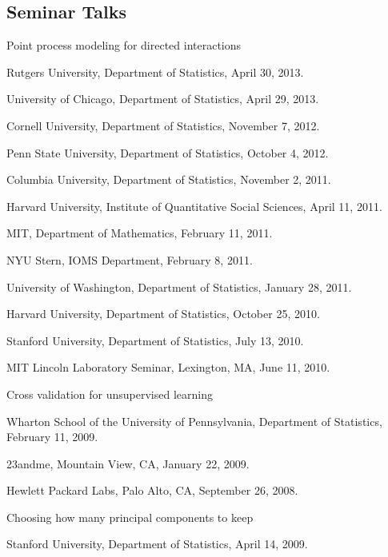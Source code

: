 \documentclass[10pt,letterpaper]{article}
\renewenvironment{itemize}{
  \begin{list}{}{
    \setlength{\leftmargin}{1.5em}
    \setlength{\itemsep}{0.25em}
    \setlength{\parskip}{0pt}
    \setlength{\parsep}{0.25em}
  }
}{
  \end{list}
}
\begin{document}
\subsection*{Seminar Talks}

\begin{itemize}

\item Point process modeling for directed interactions
  \begin{itemize}
  \item Rutgers University, Department of Statistics, April 30, 2013.
  \item University of Chicago, Department of Statistics, April 29, 2013.
  \item Cornell University, Department of Statistics, November 7, 2012.
  \item Penn State University, Department of Statistics, October 4, 2012.
  \item Columbia University, Department of Statistics, November 2, 2011.
  \item Harvard University, Institute of Quantitative Social Sciences, April 11, 2011.
  \item MIT, Department of Mathematics, February 11, 2011.
  \item NYU Stern, IOMS Department, February 8, 2011.
  \item University of Washington, Department of Statistics, January 28, 2011.
  \item %
    Harvard University, Department of Statistics, October 25, 2010.
  \item %
    Stanford University, Department of Statistics, July 13, 2010.
  \item %
    MIT Lincoln Laboratory Seminar, Lexington, MA, June 11, 2010.
  \end{itemize}


\item Cross validation for unsupervised learning
  \begin{itemize}
    \item Wharton School of the University of Pennsylvania, Department of Statistics,
      February 11, 2009. 
    \item 23andme, Mountain View, CA, January 22, 2009.
    \item Hewlett Packard Labs, Palo Alto, CA, September 26, 2008.
  \end{itemize}

\item Choosing how many principal components to keep
  \begin{itemize}
    \item Stanford University, Department of Statistics, April 14, 2009.
  \end{itemize}

\end{itemize}
\end{document}
